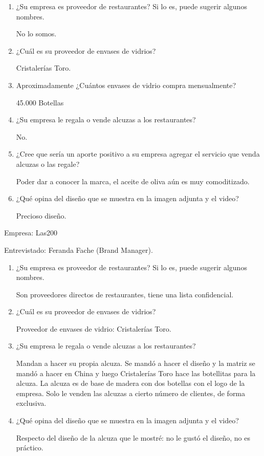 \begin{enumerate}
\item ¿Su empresa es proveedor de restaurantes? Si lo es, puede sugerir algunos nombres.

No lo somos.

\item ¿Cuál es su proveedor de envases de vidrios?

Cristalerías Toro.

 \item Aproximadamente ¿Cuántos envases de vidrio compra mensualmente?

45.000 Botellas

 \item ¿Su empresa le regala o vende alcuzas a los restaurantes?

No.

\item ¿Cree que sería un aporte positivo a su empresa agregar el servicio que venda alcuzas o las regale?

 Poder dar a conocer la marca, el aceite de oliva aún es muy comoditizado.

\item ¿Qué opina del diseño que se muestra en la imagen adjunta y el video?

 Precioso diseño.

\end{enumerate}

Empresa: Las200

Entrevistado: Feranda Fache (Brand Manager).

\begin{enumerate}
\item ¿Su empresa es proveedor de restaurantes? Si lo es, puede sugerir algunos nombres.

Son proveedores directos de restaurantes, tiene una lista confidencial.

\item ¿Cuál es su proveedor de envases de vidrios?

Proveedor de envases de vidrio: Cristalerías Toro.

\item ¿Su empresa le regala o vende alcuzas a los restaurantes?

Mandan a hacer su propia alcuza. Se mandó a hacer el diseño y la matriz se mandó a hacer en China y luego Cristalerías Toro hace las botellitas para la alcuza. La alcuza es de base de madera con dos botellas con el logo de la empresa. Solo le venden las alcuzas a cierto número de clientes, de forma exclusiva.

\item ¿Qué opina del diseño que se muestra en la imagen adjunta y el video?

Respecto del diseño de la alcuza que le mostré: no le gustó el diseño, no es práctico.
\end{enumerate}
